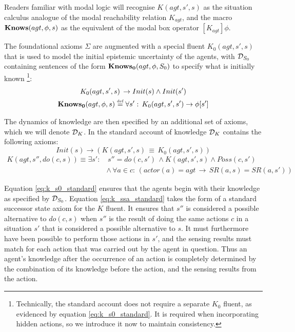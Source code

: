 Readers familiar with modal logic will recognise $K(agt,s',s)$ as
the situation calculus analogue of the modal reachability relation
$K_{agt}$, and the macro $\mathbf{Knows}(agt,\phi,s)$ as the equivalent
of the modal box operator $[K_{agt}]\phi$.

The foundational axioms $\Sigma$ are augmented with a special fluent
$K_{0}(agt,s',s)$ that is used to model the initial epistemic uncertainty
of the agents, with $\mathcal{D}_{S_{0}}$ containing sentences of the form
$\mathbf{Knows_{0}}(agt,\phi,S_{0})$ to specify what is initially known%
\footnote{Technically, the standard account does not require a separate $K_{0}$
fluent, as evidenced by equation \eqref{eq:k_s0_standard}. It is
required when incorporating hidden actions, so we introduce it now
to maintain consistency. %
}:\begin{gather*}
K_{0}(agt,s',s)\,\rightarrow Init(s)\wedge Init(s')\\
\mathbf{Knows_{0}}(agt,\phi,s)\stackrel{\mbox{\tiny def}}{=}\forall s':\, K_{0}(agt,s',s')\rightarrow\phi[s']\end{gather*}


The dynamics of knowledge are then specified by an additional set
of axioms, which we will denote $\mathcal{D}_{K}$. In the standard account
of knowledge $\mathcal{D}_{K}$ contains the following axioms:\begin{equation}
Init(s)\rightarrow\left(K(agt,s',s)\,\equiv\, K_{0}(agt,s',s)\right)\label{eq:k_s0_standard}\end{equation}
 \begin{align}
K(agt,s'',do(c,s))\equiv\exists s': & \, s''=do(c,s')\,\wedge K(agt,s',s)\wedge Poss(c,s')\nonumber \\
 & \wedge\,\forall a\in c:\,\left(actor(a)=agt\,\rightarrow\, SR(a,s)=SR(a,s')\right)\label{eq:k_ssa_standard}\end{align}


Equation \eqref{eq:k_s0_standard} ensures that the agents begin with
their knowledge as specified by $\mathcal{D}_{S_{0}}$. Equation \eqref{eq:k_ssa_standard}
takes the form of a standard successor state axiom for the $K$ fluent.
It ensures that $s''$ is considered a possible alternative to $do(c,s)$
when $s''$ is the result of doing the same actions $c$ in a situation
$s'$ that is considered a possible alternative to $s$. It must furthermore
have been possible to perform those actions in $s'$, and the sensing
results must match for each action that was carried out by the agent
in question. Thus an agent's knowledge after the occurrence of an
action is completely determined by the combination of its knowledge
before the action, and the sensing results from the action.


